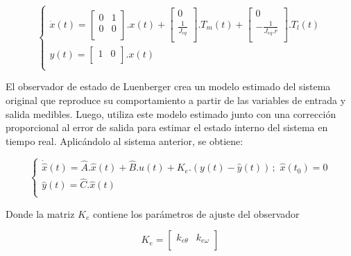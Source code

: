 \documentclass{article}
\begin{document}
\begin{equation}
    \begin{cases}
        \dot{x}(t) = 
        \begin{bmatrix}
            0 & 1 \\
            0 & 0 \\
        \end{bmatrix}
        .x(t) + 
        \begin{bmatrix}
            0 \\
            \frac{1}{J_{eq}} \\
        \end{bmatrix}
        .T_m(t) +
        \begin{bmatrix}
            0 \\
            -\frac{1}{J_{eq}.r} \\
        \end{bmatrix}
        .T_l(t)\\
        y(t) = 
        \begin{bmatrix}
            1 & 0 \\
        \end{bmatrix}
        .x(t) \\
    \end{cases}
\end{equation}

El observador de estado de Luenberger crea un modelo estimado del sistema original que reproduce su 
comportamiento a partir de las variables de entrada y salida medibles. Luego, utiliza este modelo estimado 
junto con una corrección proporcional al error de salida para estimar el estado interno del sistema en 
tiempo real. Aplicándolo al sistema anterior, se obtiene:

\begin{equation}
    \begin{cases}
        \dot{\hat{x}}(t) = \hat{A}.\hat{x}(t) + \hat{B}.u(t) + K_e.(y(t) - \hat{y}(t)) \, ; \,\, \hat{x}(t_0) = 0\\
        \hat{y}(t) = \hat{C}.\hat{x}(t) \\
    \end{cases}
\end{equation}

Donde la matriz $K_e$ contiene los parámetros de ajuste del observador

\begin{equation}
    K_e = 
    \begin{bmatrix}
        k_{e\theta} & k_{e\omega} \\
    \end{bmatrix}
\end{equation}
\end{document}

